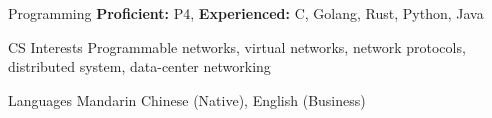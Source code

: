 
\begin{cvskills}
    \cvskill
    {Programming} %
    {\textbf{Proficient:} P4, \textbf{Experienced:} C, Golang, Rust, Python, Java} %
    
    \cvskill
    {CS Interests} %
    {Programmable networks, virtual networks, network protocols, distributed system, data-center networking} %


      \cvskill
        {Languages} %
        {Mandarin Chinese (Native), English (Business)} %
    
\end{cvskills}
